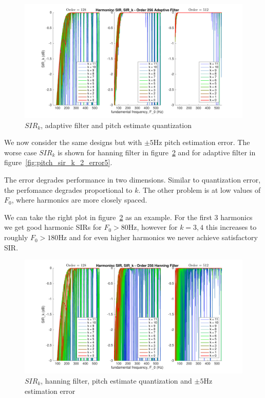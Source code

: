 \documentclass [11pt, proquest,oneside] {ganter_thesis}[2015/03/03]
\begin{document}
\begin{figure}[!ht]
  \centering
    \includegraphics[width=1\textwidth]{pitch_sir_k_2}
    \caption{$SIR_k$, adaptive filter and pitch estimate quantization}\label{fig:pitch_sir_k_2}
\end{figure}

We now consider the same designs but with $\pm5$Hz pitch estimation error.  The worse case $SIR_k$ is shown for hanning filter in figure~\ref{fig:pitch_sir_k_1_error5} and for adaptive filter in figure~\ref{fig:pitch_sir_k_2_error5}.

The error degrades performance in two dimensions.  Similar to quantization error, the perfomance degrades proportional to $k$.  The other problem is at low values of $F_0$, where harmonics are more closely spaced.

We can take the right plot in figure~\ref{fig:pitch_sir_k_1_error5} as an example.  For the first 3 harmonics we get good harmonic SIRs for $F_0 > 80$Hz, however for $k = 3,4$ this increases to roughly $F_0 > 180$Hz and for even higher harmonics we never achieve satisfactory SIR.

\begin{figure}[!ht]
  \centering
    \includegraphics[width=1\textwidth]{pitch_sir_k_1_error5}
    \caption{$SIR_k$, hanning filter, pitch estimate quantization and $\pm5$Hz estimation error}\label{fig:pitch_sir_k_1_error5}
\end{figure}
\end{document}
